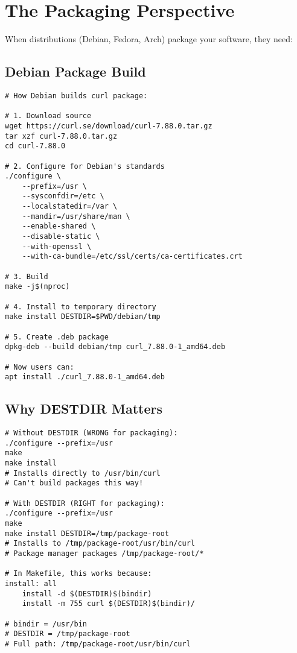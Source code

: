 \section{The Packaging Perspective}

When distributions (Debian, Fedora, Arch) package your software, they need:

\subsection{Debian Package Build}

\begin{lstlisting}
# How Debian builds curl package:

# 1. Download source
wget https://curl.se/download/curl-7.88.0.tar.gz
tar xzf curl-7.88.0.tar.gz
cd curl-7.88.0

# 2. Configure for Debian's standards
./configure \
    --prefix=/usr \
    --sysconfdir=/etc \
    --localstatedir=/var \
    --mandir=/usr/share/man \
    --enable-shared \
    --disable-static \
    --with-openssl \
    --with-ca-bundle=/etc/ssl/certs/ca-certificates.crt

# 3. Build
make -j$(nproc)

# 4. Install to temporary directory
make install DESTDIR=$PWD/debian/tmp

# 5. Create .deb package
dpkg-deb --build debian/tmp curl_7.88.0-1_amd64.deb

# Now users can:
apt install ./curl_7.88.0-1_amd64.deb
\end{lstlisting}

\subsection{Why DESTDIR Matters}

\begin{lstlisting}
# Without DESTDIR (WRONG for packaging):
./configure --prefix=/usr
make
make install
# Installs directly to /usr/bin/curl
# Can't build packages this way!

# With DESTDIR (RIGHT for packaging):
./configure --prefix=/usr
make
make install DESTDIR=/tmp/package-root
# Installs to /tmp/package-root/usr/bin/curl
# Package manager packages /tmp/package-root/*

# In Makefile, this works because:
install: all
	install -d $(DESTDIR)$(bindir)
	install -m 755 curl $(DESTDIR)$(bindir)/

# bindir = /usr/bin
# DESTDIR = /tmp/package-root
# Full path: /tmp/package-root/usr/bin/curl
\end{lstlisting}

